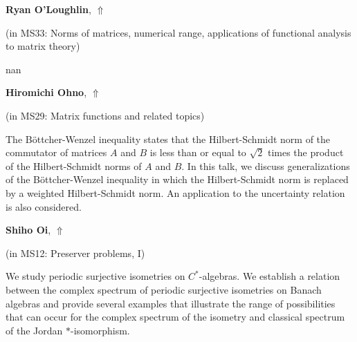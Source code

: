 \documentclass[ILAS2025-program.tex]{subfiles}
\begin{document}
\hypertarget{down0277}{}\begin{ilasabstract}
    
\textbf{Ryan O'Loughlin},  \hfill \hyperlink{up0277}{$\Uparrow$}
    
    
(in {\color{mstitle}MS33: Norms of matrices, numerical range, applications of functional analysis to matrix theory})
        
\mtskip
    nan
\end{ilasabstract}
    

\hypertarget{down0014}{}\begin{ilasabstract}
    
\textbf{Hiromichi Ohno},  \hfill \hyperlink{up0014}{$\Uparrow$}
    
    
(in {\color{mstitle}MS29: Matrix functions and related topics})
        
\mtskip
    The B\"ottcher-Wenzel inequality states that the Hilbert-Schmidt norm of the commutator of matrices $A$ and $B$ is less than or equal to $\sqrt{2}$ times the product of the Hilbert-Schmidt norms of $A$ and $B$. In this talk, we discuss generalizations of the B\"ottcher-Wenzel inequality in which the Hilbert-Schmidt norm is replaced by a weighted Hilbert-Schmidt norm. An application to the uncertainty relation is also considered.
\end{ilasabstract}
    

\hypertarget{down0163}{}\begin{ilasabstract}
    
\textbf{Shiho Oi},  \hfill \hyperlink{up0163}{$\Uparrow$}
    
    
(in {\color{mstitle}MS12: Preserver problems, I})
        
\mtskip
    We study periodic surjective isometries on $C^{*}$-algebras.  We establish a relation between the complex spectrum of periodic surjective isometries on Banach algebras  and provide several examples that illustrate the range of possibilities that can occur for the complex spectrum of the isometry and classical spectrum of the Jordan $\ast$-isomorphism.

\end{ilasabstract}
    
\end{document}
